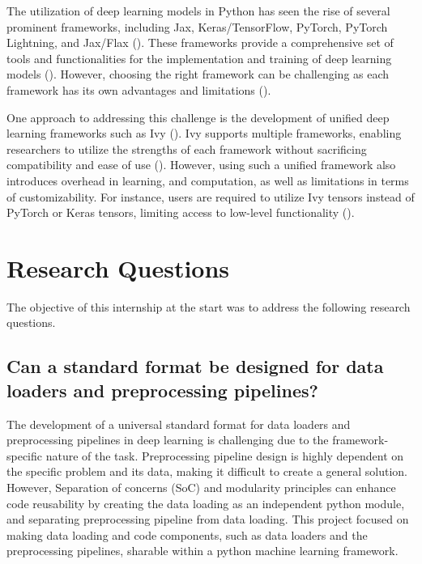 \documentclass{IEEEtran}
\begin{document}
The utilization of deep learning models in Python has seen the rise of several prominent frameworks, including Jax, Keras/TensorFlow, PyTorch, PyTorch Lightning, and Jax/Flax (\cite{mihajlovic2020use,raschka2020machine, nguyen2019machine, shatnawi2018comparative}). These frameworks provide a comprehensive set of tools and functionalities for the implementation and training of deep learning models (\cite{elshawi2021dlbench}). 
However, choosing the right framework can be challenging as each framework has its own advantages and limitations (\cite{nguyen2019machine, elshawi2021dlbench,shatnawi2018comparative}).

One approach to addressing this challenge is the development of unified deep learning frameworks such as Ivy (\cite{ivy}). Ivy supports multiple frameworks, enabling researchers to utilize the strengths of each framework without sacrificing compatibility and ease of use (\cite{ivy}). However, using such a unified framework also introduces overhead in learning, and computation, as well as limitations in terms of customizability. For instance, users are required to utilize Ivy tensors instead of PyTorch or Keras tensors, limiting access to low-level functionality (\cite{IvyDocs, ivy}).


\section{Research Questions}

The objective of this internship at the start was to address the following research questions.

\subsection{Can a standard format be designed for data loaders and preprocessing pipelines?}
{
The development of a universal standard format for data loaders and preprocessing pipelines in deep learning is challenging due to the framework-specific nature of the task. Preprocessing pipeline design is highly dependent on the specific problem and its data, making it difficult to create a general solution. However, Separation of concerns (SoC) and modularity principles can enhance code reusability by creating the data loading as an independent python module, and separating preprocessing pipeline from data loading. This project focused on making data loading and code components, such as data loaders and the preprocessing pipelines, sharable within a python machine learning framework.
}
\end{document}
